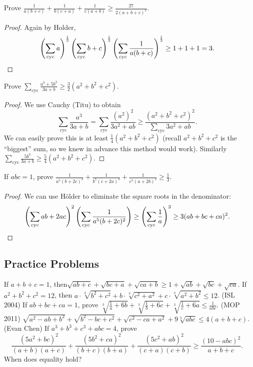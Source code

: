 \documentclass[11pt]{scrartcl}
\begin{document}
\begin{example}
	[Balkan] Prove  $\frac{1}{a(b+c)} + \frac{1}{b(c+a)} + \frac{1}{c(a+b)} \ge \frac{27}{2(a+b+c)^2}$.
\end{example}
\begin{proof}
	Again by Holder,
	\[
		\left( \sum_{\text{cyc}} a \right)^{\frac 13}
		\left( \sum_{\text{cyc}} b+c \right)^{\frac 13}
		\left( \sum_{\text{cyc}} \frac{1}{a(b+c)} \right)^{\frac13}
		\ge 1+1+1
		= 3. \qedhere \]
\end{proof}

\begin{example}
	[JMO 2012] Prove $\sum_{\text{cyc}} \frac{a^3+5b^3}{3a+b} \ge \frac 32 \left( a^2+b^2+c^2 \right)$.
\end{example}
\begin{proof}
	We use Cauchy (Titu) to obtain
	\[ \sum_{\text{cyc}} \frac{a^3}{3a+b}  = \sum_{\text{cyc}} \frac{(a^2)^2}{3a^2+ab} \ge \frac{(a^2+b^2+c^2)^2}{\sum_{\text{cyc}} 3a^2+ab}. \]
	We can easily prove this is at least $\frac14 (a^2+b^2+c^2)$
	(recall $a^2+b^2+c^2$ is the ``biggest'' sum,
	so we knew in advance this method would work).
	Similarly $\sum_{\text{cyc}} \frac{5b^3}{3a+b} \ge \frac 54 (a^2+b^2+c^2)$.
\end{proof}

\begin{example}
	 If $abc=1$, prove $ \frac{1}{a^5(b+2c)^2}+\frac{1}{b^5(c+2a)^2}+\frac{1}{c^5(a+2b)^2}\ge\frac{1}{3} $.
\end{example}
\begin{proof}
	We can use H\"older to eliminate the square roots in the denominator:
	\[ \left(\sum_{\text{cyc}}ab+2 ac\right)^2\left(\sum_{\text{cyc}}\frac{1}{a^5(b+2c)^2}\right)\ge\left(\sum_{\text{cyc}}\frac{1}{a}\right)^3\ge 3(ab+bc+ca)^2. \qedhere \]
\end{proof}


\subsection{Practice Problems}
\begin{enumerate}
	\ii If $a+b+c=1$, then$\sqrt{ab+c}+\sqrt{bc+a}+\sqrt{ca+b} \ge 1+\sqrt{ab}+\sqrt{bc}+\sqrt{ca}$.
	\ii If $a^2+b^2+c^2=12$, then $a\cdot\sqrt[3]{b^2+c^2}+b\cdot\sqrt[3]{c^2+a^2}+c\cdot\sqrt[3]{a^2+b^2}\leq 12$.
	\ii (ISL 2004) If $ab+bc+ca=1$, prove $ \sqrt[3]{\frac{1}{a}+6b}+\sqrt[3]{\frac{1}{b}+6c}+\sqrt[3]{\frac{1}{c}+6a }\leq\frac{1}{abc}$.
	\ii (MOP 2011) $\sqrt{a^2-ab+b^2}+\sqrt{b^2-bc+c^2} + \sqrt{c^2-ca+a^2} + 9\sqrt[3]{abc} \le 4(a+b+c)$.
	\ii (Evan Chen) If $a^3+b^3+c^3+abc=4$, prove
	\[ \frac{(5a^2+bc)^2}{(a+b)(a+c)}+\frac{(5b^2+ca)^2}{(b+c)(b+a)}+\frac{(5c^2+ab)^2}{(c+a)(c+b)}\ge\frac{(10-abc)^2}{a+b+c}. \]
	When does equality hold?
\end{enumerate}
\end{document}
